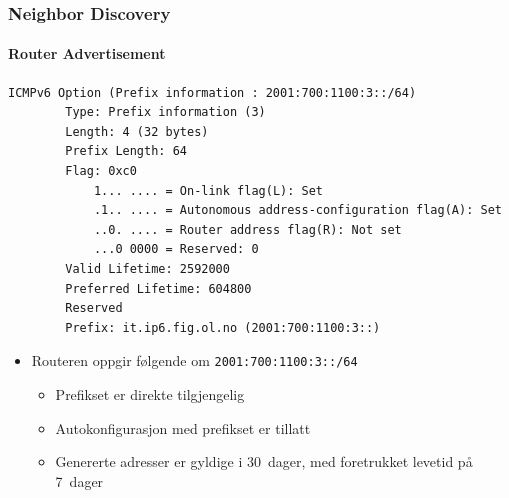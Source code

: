 \begin{frame}[fragile]%
  \frametitle{Neighbor Discovery}
  \framesubtitle{Router Advertisement}
  \begin{multicols}{2}
\begin{Verbatim}[fontsize=\tiny]
    ICMPv6 Option (Prefix information : 2001:700:1100:3::/64)
        Type: Prefix information (3)
        Length: 4 (32 bytes)
        Prefix Length: 64
        Flag: 0xc0
            1... .... = On-link flag(L): Set
            .1.. .... = Autonomous address-configuration flag(A): Set
            ..0. .... = Router address flag(R): Not set
            ...0 0000 = Reserved: 0
        Valid Lifetime: 2592000
        Preferred Lifetime: 604800
        Reserved
        Prefix: it.ip6.fig.ol.no (2001:700:1100:3::)
\end{Verbatim}
  \columnbreak
  \begin{itemize}%
  \item Routeren oppgir følgende om \texttt{2001:700:1100:3::/64}
    \begin{itemize}%
    \item Prefikset er direkte tilgjengelig
    \item Autokonfigurasjon med prefikset er tillatt
    \item Genererte adresser er gyldige i 30~dager, med foretrukket
      levetid på 7~dager
    \end{itemize}
  \end{itemize}
  \end{multicols}
\end{frame}

